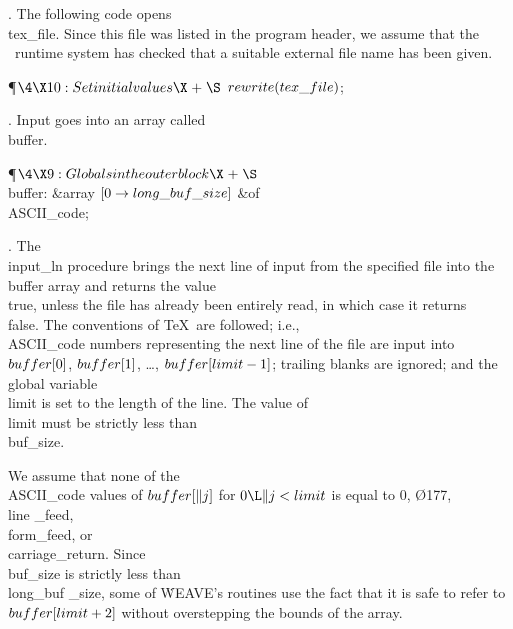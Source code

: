 . The following code opens \\{tex\_file}.
Since this file was listed in the program header, we assume that the
\PASCAL\ runtime system has checked that a suitable external file name has
been given.

\Y\P$\4\X10:Set initial values\X\mathrel{+}\S$\6
$\\{rewrite}(\\{tex\_file})$;\par
\fi

. Input goes into an array called \\{buffer}.

\Y\P$\4\X9:Globals in the outer block\X\mathrel{+}\S$\6
\4\\{buffer}: \&{array} $[0\to\\{long\_buf\_size}]$ \1\&{of}\5
\\{ASCII\_code};\2\par
\fi

. The \\{input\_ln} procedure brings the next line of input from the
specified
file into the \\{buffer} array and returns the value \\{true}, unless the file
has
already been entirely read, in which case it returns \\{false}. The conventions
of \TeX\ are followed; i.e., \\{ASCII\_code} numbers representing the next line
of the file are input into $\\{buffer}[0]$, $\\{buffer}[1]$, \dots,
$\\{buffer}[\\{limit}-1]$; trailing blanks are ignored;
and the global variable \\{limit} is set to the length of the
line. The value of \\{limit} must be strictly less than \\{buf\_size}.

We assume that none of the \\{ASCII\_code} values
of $\\{buffer}[\|j]$ for $0\L\|j<\\{limit}$ is equal to 0, \O{177}, \\{line%
\_feed}, \\{form\_feed},
or \\{carriage\_return}. Since \\{buf\_size} is strictly less than \\{long\_buf%
\_size},
some of \.{WEAVE}'s routines use the fact that it is safe to refer to
$\\{buffer}[\\{limit}+2]$ without overstepping the bounds of the array.

